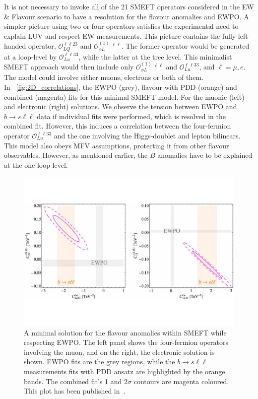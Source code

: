 It is not necessary to invoke all of the 21 SMEFT operators considered in the { EW \& Flavour} scenario to have a resolution for the flavour anomalies and EWPO. A simpler picture using two or four operators satisfies the experimental need to explain LUV and respect EW measurements. This picture contains the fully left-handed operator, $\mathcal{O}_{LQ}^{\ell \ell 2 3}$ and $\mathcal{O}_{\phi L}^{(1)} \ ^{\ell \ell}$. The former operator would be generated at a loop-level by $\mathcal{O}_{Lu}^{\ell \ell 3 3}$, while the latter at the tree level.  This minimalist SMEFT approach would then include only  $\mathcal{O}_{\phi L}^{(1)} \ ^{\ell \ell}$ and $\mathcal{O}_{Lu}^{\ell \ell 3 3}$, and $\ell= \mu, e$.  The model could involve either muons, electrons or both of them.\\ 
In~ \autoref{fig:2D_correlations}, the EWPO (grey), flavour with PDD (orange) and combined (magenta) fits for this minimal SMEFT model. For the muonic (left) and electronic (right) solutions. We observe the tension between EWPO and $b \to s \ell \ell$ data if individual fits were performed, which is resolved in the combined fit. However, this induces a correlation between the four-fermion operator $\mathcal{O}_{Lu}^{\ell \ell 3 3}$ and the one involving the Higgs-doublet and lepton bilinears. This model also obeys MFV assumptions, protecting it from other flavour observables. However, as mentioned earlier, the $B$ anomalies have to be explained at the one-loop level. 
\begin{figure}[htpb!]
	\includegraphics[width=\textwidth]{figures/CHL_CLu.pdf}
	\caption{ A minimal solution for the flavour anomalies within SMEFT while respecting EWPO. The left panel shows the four-fermion operators involving the muon, and on the right, the electronic solution is shown. EWPO fits are the grey regions, while the $b \to s\ell \ell$ measurements fits with PDD ansatz are highlighted by the orange bands. The combined fit's 1 and 2$\sigma$ contours are magenta coloured. This plot has been published in~\cite{Alasfar:2020mne}.  } 
	\label{fig:2D_correlations}
\end{figure}
